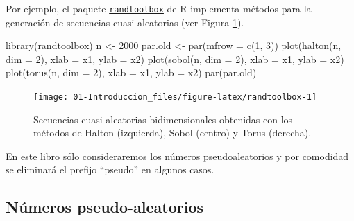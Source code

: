 \documentclass[
]{book}
\newenvironment{Shaded}{\begin{snugshade}}{\end{snugshade}}
\newcommand{\AttributeTok}[1]{\textcolor[rgb]{0.77,0.63,0.00}{#1}}
\newcommand{\DecValTok}[1]{\textcolor[rgb]{0.00,0.00,0.81}{#1}}
\newcommand{\FunctionTok}[1]{\textcolor[rgb]{0.00,0.00,0.00}{#1}}
\newcommand{\NormalTok}[1]{#1}
\newcommand{\OtherTok}[1]{\textcolor[rgb]{0.56,0.35,0.01}{#1}}
\newcommand{\StringTok}[1]{\textcolor[rgb]{0.31,0.60,0.02}{#1}}
\theoremstyle{break}
\theoremstyle{nonumberplain}
\begin{document}
Por ejemplo, el paquete \href{https://CRAN.R-project.org/package=randtoolbox}{\texttt{randtoolbox}} de R implementa métodos para la generación de secuencias cuasi-aleatorias (ver Figura \ref{fig:randtoolbox}).

\begin{Shaded}
\begin{Highlighting}[]
\FunctionTok{library}\NormalTok{(randtoolbox)}
\NormalTok{n }\OtherTok{\textless{}{-}} \DecValTok{2000}
\NormalTok{par.old }\OtherTok{\textless{}{-}} \FunctionTok{par}\NormalTok{(}\AttributeTok{mfrow =} \FunctionTok{c}\NormalTok{(}\DecValTok{1}\NormalTok{, }\DecValTok{3}\NormalTok{))}
\FunctionTok{plot}\NormalTok{(}\FunctionTok{halton}\NormalTok{(n, }\AttributeTok{dim =} \DecValTok{2}\NormalTok{), }\AttributeTok{xlab =} \StringTok{\textquotesingle{}x1\textquotesingle{}}\NormalTok{, }\AttributeTok{ylab =} \StringTok{\textquotesingle{}x2\textquotesingle{}}\NormalTok{)}
\FunctionTok{plot}\NormalTok{(}\FunctionTok{sobol}\NormalTok{(n, }\AttributeTok{dim =} \DecValTok{2}\NormalTok{), }\AttributeTok{xlab =} \StringTok{\textquotesingle{}x1\textquotesingle{}}\NormalTok{, }\AttributeTok{ylab =} \StringTok{\textquotesingle{}x2\textquotesingle{}}\NormalTok{)}
\FunctionTok{plot}\NormalTok{(}\FunctionTok{torus}\NormalTok{(n, }\AttributeTok{dim =} \DecValTok{2}\NormalTok{), }\AttributeTok{xlab =} \StringTok{\textquotesingle{}x1\textquotesingle{}}\NormalTok{, }\AttributeTok{ylab =} \StringTok{\textquotesingle{}x2\textquotesingle{}}\NormalTok{)}
\FunctionTok{par}\NormalTok{(par.old)}
\end{Highlighting}
\end{Shaded}

\begin{figure}[!htb]

{\centering \texttt{[image: 01-Introduccion\_files/figure-latex/randtoolbox-1]} 

}

\caption{Secuencias cuasi-aleatorias bidimensionales obtenidas con los métodos de Halton (izquierda), Sobol (centro) y Torus (derecha).}\label{fig:randtoolbox}
\end{figure}

En este libro sólo consideraremos los números pseudoaleatorios y por comodidad se eliminará el prefijo ``pseudo'' en algunos casos.

\hypertarget{nuxfameros-pseudo-aleatorios}{%
\subsection{Números pseudo-aleatorios}\label{nuxfameros-pseudo-aleatorios}}
\end{document}
